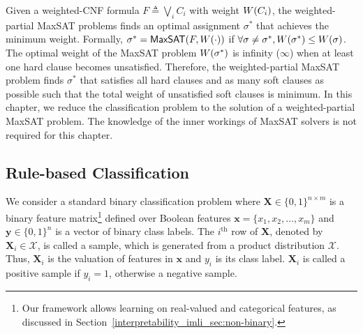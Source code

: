 Given a weighted-CNF formula $F \triangleq \bigvee_i C_i$ with weight $ W \! \left( C_i \right) $, the weighted-partial MaxSAT problems finds an optimal assignment $\sigma^*$ that achieves the minimum weight. Formally,  $\sigma^* = \mathsf{MaxSAT}(F,W \! \left( \cdot \right))$ if $\forall \sigma \neq \sigma^*, W \! \left( \sigma^* \right) \leq W \! \left( \sigma \right)$. The optimal weight of the MaxSAT problem $  W \! \left( \sigma^* \right) $ is infinity ($ \infty $) when at least one hard clause becomes unsatisfied.  Therefore,  the weighted-partial MaxSAT problem finds $ \sigma^* $ that satisfies all hard clauses and as many soft clauses as possible such that the total weight of unsatisfied soft clauses is minimum. In this chapter, we reduce the classification problem  to the solution of a weighted-partial MaxSAT problem. The knowledge of the inner workings of {MaxSAT} solvers is  not required for this chapter.  

%


\subsection{Rule-based Classification}

We consider a standard binary classification problem where $ \mathbf{X} \in \{0,1\}^{n\times m} $ is a binary feature matrix\footnote{Our framework allows learning on real-valued and categorical features, as discussed in Section~\ref{interpretability_imli_sec:non-binary}.} defined over Boolean features $\mathbf{x} = \{x_1, x_2, \dots, x_m\}$ and $ \mathbf{y} \in \{0,1\}^n $ is a vector of binary class labels.  The $ i^\text{th} $ row of $ \mathbf{X} $, denoted by $ \mathbf{X}_i \in \mathcal{X} $, is called a sample, which is generated from a product distribution $ \mathcal{X} $. Thus, $ \mathbf{X}_i $ is the valuation of features in $ \mathbf{x} $ and $ y_i $ is its class label.  $ \mathbf{X}_i $ is called a positive sample if $ y_i = 1 $, otherwise a negative sample.


